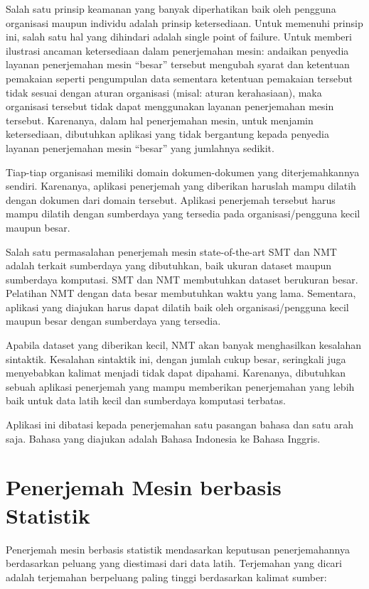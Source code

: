 \documentclass[conference]{IEEEtran}
\begin{document}
Salah satu prinsip keamanan yang banyak diperhatikan baik oleh pengguna organisasi maupun individu adalah prinsip ketersediaan. Untuk memenuhi prinsip ini, salah satu hal yang dihindari adalah single point of failure. Untuk memberi ilustrasi ancaman ketersediaan dalam penerjemahan mesin: andaikan penyedia layanan penerjemahan mesin “besar” tersebut mengubah syarat dan ketentuan pemakaian seperti pengumpulan data sementara ketentuan pemakaian tersebut tidak sesuai dengan aturan organisasi (misal: aturan kerahasiaan), maka organisasi tersebut tidak dapat menggunakan layanan penerjemahan mesin tersebut. Karenanya, dalam hal penerjemahan mesin, untuk menjamin ketersediaan, dibutuhkan aplikasi yang tidak bergantung kepada penyedia layanan penerjemahan mesin “besar” yang jumlahnya sedikit.

Tiap-tiap organisasi memiliki domain dokumen-dokumen yang diterjemahkannya sendiri. Karenanya, aplikasi penerjemah yang diberikan haruslah mampu dilatih dengan dokumen dari domain tersebut. Aplikasi penerjemah tersebut harus mampu dilatih dengan sumberdaya yang tersedia pada organisasi/pengguna kecil maupun besar.

Salah satu permasalahan penerjemah mesin state-of-the-art SMT dan NMT adalah terkait sumberdaya yang dibutuhkan, baik ukuran dataset maupun sumberdaya komputasi. SMT dan NMT membutuhkan dataset berukuran besar. Pelatihan NMT dengan data besar membutuhkan waktu yang lama. Sementara, aplikasi yang diajukan harus dapat dilatih baik oleh organisasi/pengguna kecil maupun besar dengan sumberdaya yang tersedia.

Apabila dataset yang diberikan kecil, NMT akan banyak menghasilkan kesalahan sintaktik. Kesalahan sintaktik ini, dengan jumlah cukup besar, seringkali juga menyebabkan kalimat menjadi tidak dapat dipahami. Karenanya, dibutuhkan sebuah aplikasi penerjemah yang mampu memberikan penerjemahan yang lebih baik untuk data latih kecil dan sumberdaya komputasi terbatas.

Aplikasi ini dibatasi kepada penerjemahan satu pasangan bahasa dan satu arah saja. Bahasa yang diajukan adalah Bahasa Indonesia ke Bahasa Inggris.

\section{Penerjemah Mesin berbasis Statistik}

Penerjemah mesin berbasis statistik mendasarkan keputusan penerjemahannya berdasarkan peluang yang diestimasi dari data latih. Terjemahan yang dicari adalah terjemahan berpeluang paling tinggi berdasarkan kalimat sumber:
\end{document}

